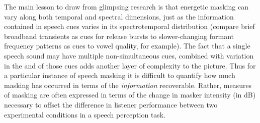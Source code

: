 
The main lesson to draw from glimpsing research is that energetic masking can vary along both temporal and spectral dimensions, just as the information contained in speech cues varies in its spectrotemporal distribution (compare brief broadband transients as cues for release bursts to slower-changing formant frequency patterns as cues to vowel quality, for example).  The fact that a single speech sound may have multiple non-simultaneous cues, combined with variation in the  and  of those cues adds another layer of complexity to the picture.\footnotemark{}  Thus for a particular instance of speech masking it is difficult to quantify how much masking has occurred in terms of the \emph{information} recoverable.  Rather, measures of masking are often expressed in terms of the change in masker intensity (in dB) necessary to offset the difference in listener performance between two experimental conditions in a speech perception task.

